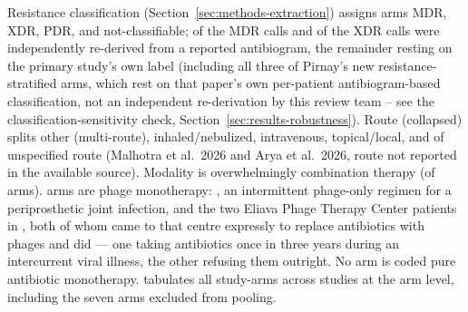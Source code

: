 Resistance classification (Section~\ref{sec:methods-extraction}) assigns \ResMDRArms arms MDR, \ResXDRArms XDR, \ResPDRArms PDR, and \ResNotClassifiableArms not-classifiable; \ResMDRVerified of the \ResMDRArms MDR calls and \ResXDRVerified of the \ResXDRArms XDR calls were independently re-derived from a reported antibiogram, the remainder resting on the primary study's own label (including all three of Pirnay's new resistance-stratified arms, which rest on that paper's own per-patient antibiogram-based classification, not an independent re-derivation by this review team -- see the classification-sensitivity check, Section~\ref{sec:results-robustness}). Route (collapsed) splits \RouteOtherArms other (multi-route), \RouteInhaledNebulizedArms inhaled/nebulized, \RouteIVArms intravenous, \RouteTopicalLocalArms topical/local, and \RouteNotReportedArms of unspecified route (Malhotra et al.\ 2026 and Arya et al.\ 2026, route not reported in the available source). Modality is overwhelmingly combination therapy (\ModPhageAntibioticCombinationArms of \ArmsAnalysed arms). \ModPhageMonotherapyArms arms are phage monotherapy: \textcite{Arya2026_pji_natcomms}, an intermittent phage-only regimen for a periprosthetic joint infection, and the two Eliava Phage Therapy Center patients in \textcite{Zaldastanishvili2021_viruses}, both of whom came to that centre expressly to replace antibiotics with phages and did --- one taking antibiotics once in three years during an intercurrent viral illness, the other refusing them outright. No arm is coded pure antibiotic monotherapy.  tabulates all \PrismaIncludedArms study-arms across \PrismaIncludedStudies studies at the arm level, including the seven arms excluded from pooling.

